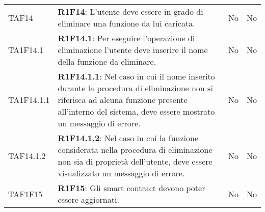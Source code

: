 \begin{longtable}{
		>{\centering}p{} 
		>{}p{}
		>{\centering}p{}
		>{\centering}p{} }
	TAF14 		& \textbf{R1F14}: L'utente deve essere in grado di eliminare una funzione da lui caricata. 																								& No & No \tabularnewline
	TA1F14.1 	& \textbf{R1F14.1}: Per eseguire l'operazione di eliminazione l'utente deve inserire il nome della funzione da eliminare. 																	& No & No \tabularnewline
	TA1F14.1.1 	& \textbf{R1F14.1.1}: Nel caso in cui il nome inserito durante la procedura di eliminazione non si riferisca ad alcuna funzione presente all'interno del sistema, deve essere mostrato un messaggio di errore.	& No & No \tabularnewline
	TAF14.1.2 	& \textbf{R1F14.1.2}: Nel caso in cui la funzione considerata nella procedura di eliminazione non sia di proprietà dell'utente, deve essere visualizzato un messaggio di errore.				& No & No \tabularnewline
	TAF1F15		& \textbf{R1F15}: Gli smart contract\ped{\textit{G}} devono poter essere aggiornati.																															& No & No \tabularnewline

\end{longtable}
